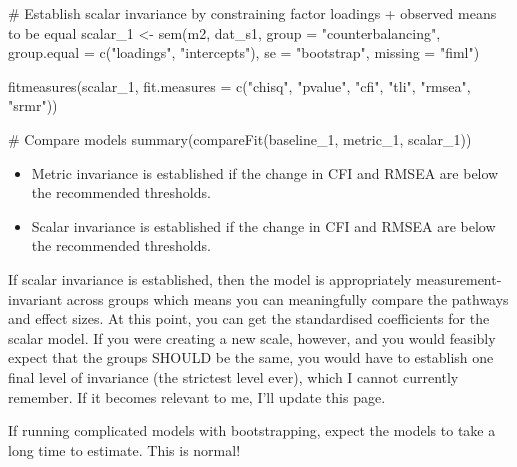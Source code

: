 \documentclass[
  letterpaper,
  DIV=11,
  numbers=noendperiod]{scrreprt}
\newenvironment{Shaded}{\begin{snugshade}}{\end{snugshade}}
\newcommand{\AttributeTok}[1]{\textcolor[rgb]{0.40,0.45,0.13}{#1}}
\newcommand{\CommentTok}[1]{\textcolor[rgb]{0.37,0.37,0.37}{#1}}
\newcommand{\FunctionTok}[1]{\textcolor[rgb]{0.28,0.35,0.67}{#1}}
\newcommand{\NormalTok}[1]{\textcolor[rgb]{0.00,0.23,0.31}{#1}}
\newcommand{\OtherTok}[1]{\textcolor[rgb]{0.00,0.23,0.31}{#1}}
\newcommand{\StringTok}[1]{\textcolor[rgb]{0.13,0.47,0.30}{#1}}
\begin{document}
\begin{Shaded}
\begin{Highlighting}[]
\CommentTok{\# Establish scalar invariance by constraining factor loadings + observed means to be equal}
\NormalTok{scalar\_1 }\OtherTok{\textless{}{-}} \FunctionTok{sem}\NormalTok{(m2, dat\_s1, }\AttributeTok{group =} \StringTok{"counterbalancing"}\NormalTok{, }\AttributeTok{group.equal =} \FunctionTok{c}\NormalTok{(}\StringTok{"loadings"}\NormalTok{, }\StringTok{"intercepts"}\NormalTok{), }\AttributeTok{se =} \StringTok{"bootstrap"}\NormalTok{, }\AttributeTok{missing =} \StringTok{"fiml"}\NormalTok{)}

\FunctionTok{fitmeasures}\NormalTok{(scalar\_1, }\AttributeTok{fit.measures =} \FunctionTok{c}\NormalTok{(}\StringTok{"chisq"}\NormalTok{, }\StringTok{"pvalue"}\NormalTok{, }\StringTok{"cfi"}\NormalTok{, }\StringTok{"tli"}\NormalTok{, }\StringTok{"rmsea"}\NormalTok{, }\StringTok{"srmr"}\NormalTok{)) }

\CommentTok{\# Compare models}
\FunctionTok{summary}\NormalTok{(}\FunctionTok{compareFit}\NormalTok{(baseline\_1, metric\_1, scalar\_1))}
\end{Highlighting}
\end{Shaded}

\begin{itemize}
\item
  Metric invariance is established if the change in CFI and RMSEA are
  below the recommended thresholds.
\item
  Scalar invariance is established if the change in CFI and RMSEA are
  below the recommended thresholds.
\end{itemize}

If scalar invariance is established, then the model is appropriately
measurement-invariant across groups which means you can meaningfully
compare the pathways and effect sizes. At this point, you can get the
standardised coefficients for the scalar model. If you were creating a
new scale, however, and you would feasibly expect that the groups SHOULD
be the same, you would have to establish one final level of invariance
(the strictest level ever), which I cannot currently remember. If it
becomes relevant to me, I'll update this page.

\begin{tcolorbox}[enhanced jigsaw, toprule=.15mm, coltitle=black, colframe=quarto-callout-note-color-frame, colbacktitle=quarto-callout-note-color!10!white, opacityback=0, left=2mm, breakable, rightrule=.15mm, bottomrule=.15mm, leftrule=.75mm, titlerule=0mm, arc=.35mm, opacitybacktitle=0.6, toptitle=1mm, bottomtitle=1mm, title=\textcolor{quarto-callout-note-color}{\faInfo}\hspace{0.5em}{Note}, colback=white]

If running complicated models with bootstrapping, expect the models to
take a long time to estimate. This is normal!

\end{tcolorbox}
\end{document}
